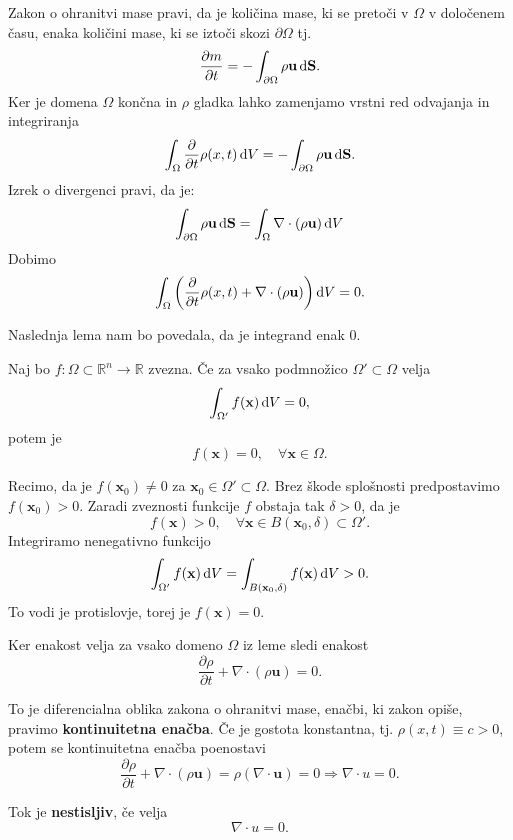 \documentclass[mat2, tisk]{fmfdelo}
\newcommand{\R}{\mathbb R}
\newcommand{\bd}{\textbf}
\begin{document}
Zakon o ohranitvi mase pravi, da je količina mase, ki se pretoči v $\Omega$ v določenem času, 
enaka količini mase, ki se iztoči skozi $\partial\Omega$ tj.
$$
\frac{\partial m}{\partial t} = - \int_{\partial \Omega} \rho\bd{u} \dif \bd{S}.
$$
Ker je domena $\Omega$ končna in $\rho$ gladka lahko zamenjamo vrstni red odvajanja in integriranja
$$
\int_\Omega \frac{\partial}{\partial t} \rho(x, t) \dif V = - \int_{\partial \Omega} \rho \bd{u} \dif \bd{S}.
$$
Izrek o divergenci pravi, da je:
$$
\int_{\partial \Omega} \rho\bd{u} \dif \bd{S} = \int_{\Omega} \nabla \cdot (\rho\bd{u}) \dif V
$$
Dobimo 
\begin{align*}
\int_\Omega \left(\frac{\partial}{\partial t} \rho(x, t) + \nabla \cdot (\rho\bd{u})\right) \dif V = 0.
\end{align*}

Naslednja lema nam bo povedala, da je integrand enak 0.

\begin{lema}
  \label{lema:1}
Naj bo $f: \Omega \subset \R^n \rightarrow \R$ zvezna. 
Če za vsako podmnožico $\Omega' \subset \Omega$ velja 
$$
\int_{\Omega'} f(\bd{x}) \dif V = 0,
$$
potem je 
$$
f(\bd{x}) = 0, \quad \forall \bd{x} \in \Omega.
$$
\end{lema}

\begin{dokaz}
Recimo, da je $f(\bd{x}_0) \neq 0$ za $\bd{x}_0 \in \Omega' \subset \Omega$. Brez škode 
splošnosti predpostavimo $f(\bd{x}_0) > 0$. Zaradi 
zveznosti funkcije $f$ obstaja tak $\delta > 0$, da je 
$$
f(\bd{x}) > 0, \quad \forall \bd{x} \in B(\bd{x}_0, \delta) \subset \Omega'.
$$
Integriramo nenegativno funkcijo 
$$
\int_{\Omega'} f(\bd{x}) \dif V = \int_{B(\bd{x}_0, \delta)} f(\bd{x}) \dif V > 0.
$$
To vodi je protislovje, torej je $f(\bd{x}) = 0$.
\end{dokaz}

Ker enakost velja za vsako domeno $\Omega$ iz leme sledi enakost
\begin{equation}
\frac{\partial \rho}{\partial t} + \nabla \cdot (\rho\bd{u}) = 0.
\end{equation}


To je diferencialna oblika zakona o ohranitvi mase, enačbi, ki zakon opiše, pravimo \textbf{kontinuitetna enačba}.
Če je gostota konstantna, tj. $\rho(x, t) \equiv c > 0$, potem se kontinuitetna enačba poenostavi
$$
\frac{\partial \rho}{\partial t} + \nabla \cdot (\rho\bd{u}) = \rho (\nabla \cdot \bd{u}) = 0 \Longrightarrow \nabla \cdot u = 0.
$$
\begin{definicija}
Tok je \textbf{nestisljiv}, če velja 
\begin{equation}
\label{ohranitev mase}
  \nabla \cdot u = 0.    
\end{equation}
\end{definicija}
\end{document}

